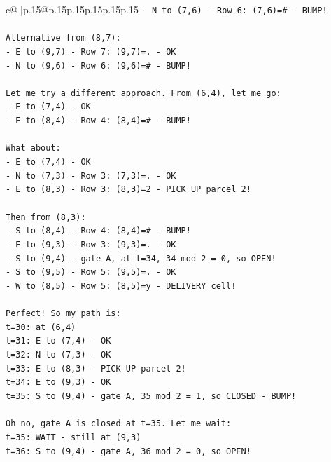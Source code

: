 \documentclass{article}
\begin{document}
{\begin{supertabular}{c@{$\;$}|p{.15\linewidth}@{}p{.15\linewidth}p{.15\linewidth}p{.15\linewidth}p{.15\linewidth}p{.15\linewidth}}
{{{\texttt{{-} N to (7,6) {-} Row 6: (7,6)=\# {-} BUMP!} \\
\\ 
\texttt{Alternative from (8,7):} \\
\texttt{{-} E to (9,7) {-} Row 7: (9,7)=. {-} OK} \\
\texttt{{-} N to (9,6) {-} Row 6: (9,6)=\# {-} BUMP!} \\
\\ 
\texttt{Let me try a different approach. From (6,4), let me go:} \\
\texttt{{-} E to (7,4) {-} OK} \\
\texttt{{-} E to (8,4) {-} Row 4: (8,4)=\# {-} BUMP!} \\
\\ 
\texttt{What about:} \\
\texttt{{-} E to (7,4) {-} OK} \\
\texttt{{-} N to (7,3) {-} Row 3: (7,3)=. {-} OK} \\
\texttt{{-} E to (8,3) {-} Row 3: (8,3)=2 {-} PICK UP parcel 2!} \\
\\ 
\texttt{Then from (8,3):} \\
\texttt{{-} S to (8,4) {-} Row 4: (8,4)=\# {-} BUMP!} \\
\texttt{{-} E to (9,3) {-} Row 3: (9,3)=. {-} OK} \\
\texttt{{-} S to (9,4) {-} gate A, at t=34, 34 mod 2 = 0, so OPEN!} \\
\texttt{{-} S to (9,5) {-} Row 5: (9,5)=. {-} OK} \\
\texttt{{-} W to (8,5) {-} Row 5: (8,5)=y {-} DELIVERY cell!} \\
\\ 
\texttt{Perfect! So my path is:} \\
\texttt{t=30: at (6,4)} \\
\texttt{t=31: E to (7,4) {-} OK} \\
\texttt{t=32: N to (7,3) {-} OK} \\
\texttt{t=33: E to (8,3) {-} PICK UP parcel 2!} \\
\texttt{t=34: E to (9,3) {-} OK} \\
\texttt{t=35: S to (9,4) {-} gate A, 35 mod 2 = 1, so CLOSED {-} BUMP!} \\
\\ 
\texttt{Oh no, gate A is closed at t=35. Let me wait:} \\
\texttt{t=35: WAIT {-} still at (9,3)} \\
\texttt{t=36: S to (9,4) {-} gate A, 36 mod 2 = 0, so OPEN!} \\
}}}
\end{supertabular}}
\end{document}
